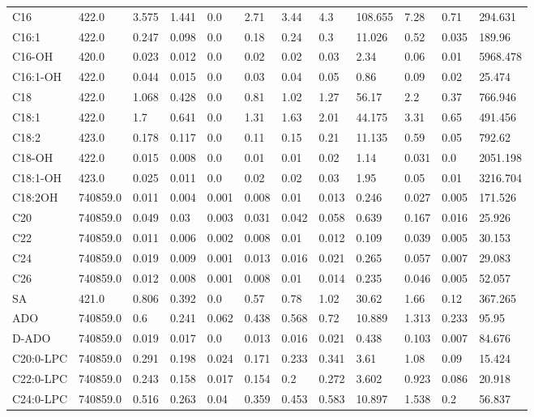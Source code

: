 \begin{tabular}{llllllllllll}
C16 & 422.0 & 3.575 & 1.441 & 0.0 & 2.71 & 3.44 & 4.3 & 108.655 & 7.28 & 0.71 & 294.631 \\
C16:1 & 422.0 & 0.247 & 0.098 & 0.0 & 0.18 & 0.24 & 0.3 & 11.026 & 0.52 & 0.035 & 189.96 \\
C16-OH & 420.0 & 0.023 & 0.012 & 0.0 & 0.02 & 0.02 & 0.03 & 2.34 & 0.06 & 0.01 & 5968.478 \\
C16:1-OH & 422.0 & 0.044 & 0.015 & 0.0 & 0.03 & 0.04 & 0.05 & 0.86 & 0.09 & 0.02 & 25.474 \\
C18 & 422.0 & 1.068 & 0.428 & 0.0 & 0.81 & 1.02 & 1.27 & 56.17 & 2.2 & 0.37 & 766.946 \\
C18:1 & 422.0 & 1.7 & 0.641 & 0.0 & 1.31 & 1.63 & 2.01 & 44.175 & 3.31 & 0.65 & 491.456 \\
C18:2 & 423.0 & 0.178 & 0.117 & 0.0 & 0.11 & 0.15 & 0.21 & 11.135 & 0.59 & 0.05 & 792.62 \\
C18-OH & 422.0 & 0.015 & 0.008 & 0.0 & 0.01 & 0.01 & 0.02 & 1.14 & 0.031 & 0.0 & 2051.198 \\
C18:1-OH & 423.0 & 0.025 & 0.011 & 0.0 & 0.02 & 0.02 & 0.03 & 1.95 & 0.05 & 0.01 & 3216.704 \\
C18:2OH & 740859.0 & 0.011 & 0.004 & 0.001 & 0.008 & 0.01 & 0.013 & 0.246 & 0.027 & 0.005 & 171.526 \\
C20 & 740859.0 & 0.049 & 0.03 & 0.003 & 0.031 & 0.042 & 0.058 & 0.639 & 0.167 & 0.016 & 25.926 \\
C22 & 740859.0 & 0.011 & 0.006 & 0.002 & 0.008 & 0.01 & 0.012 & 0.109 & 0.039 & 0.005 & 30.153 \\
C24 & 740859.0 & 0.019 & 0.009 & 0.001 & 0.013 & 0.016 & 0.021 & 0.265 & 0.057 & 0.007 & 29.083 \\
C26 & 740859.0 & 0.012 & 0.008 & 0.001 & 0.008 & 0.01 & 0.014 & 0.235 & 0.046 & 0.005 & 52.057 \\
SA & 421.0 & 0.806 & 0.392 & 0.0 & 0.57 & 0.78 & 1.02 & 30.62 & 1.66 & 0.12 & 367.265 \\
ADO & 740859.0 & 0.6 & 0.241 & 0.062 & 0.438 & 0.568 & 0.72 & 10.889 & 1.313 & 0.233 & 95.95 \\
D-ADO & 740859.0 & 0.019 & 0.017 & 0.0 & 0.013 & 0.016 & 0.021 & 0.438 & 0.103 & 0.007 & 84.676 \\
C20:0-LPC & 740859.0 & 0.291 & 0.198 & 0.024 & 0.171 & 0.233 & 0.341 & 3.61 & 1.08 & 0.09 & 15.424 \\
C22:0-LPC & 740859.0 & 0.243 & 0.158 & 0.017 & 0.154 & 0.2 & 0.272 & 3.602 & 0.923 & 0.086 & 20.918 \\
C24:0-LPC & 740859.0 & 0.516 & 0.263 & 0.04 & 0.359 & 0.453 & 0.583 & 10.897 & 1.538 & 0.2 & 56.837 \\

\end{tabular}
